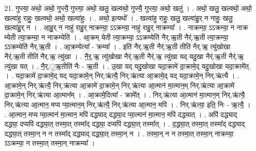 \documentclass[17pt]{extarticle}
\begin{document}
21. गुप्त्या॒ अथो॒ अथो॒ गुप्त्यै॒ गुप्त्या॒ अथो॒ खलु॒ खल्वथो॒ गुप्त्यै॒ गुप्त्या॒ अथो॒ खलु॑ । . अथो॒ खलु॒ खल्वथो॒ अथो॒ खल्वा॑हु राहुः॒ खल्वथो॒ अथो॒ खल्वा॑हुः । . अथो॒ इत्यथो᳚ । . खल्वा॑हु राहुः॒ खलु॒ खल्वा॑हु॒र् न नाहुः॒ खलु॒ खल्वा॑हु॒र् न । . आ॒हु॒र् न नाहु॑ राहु॒र् नाक्रम्या॒ ऽऽक्रम्या॒ नाहु॑ राहु॒र् नाक्रम्या᳚ । . नाक्रम्या॒ ऽऽक्रम्या॒ न नाक्र म्येती त्या॒क्रम्या॒ न नाक्रम्येति॑ । . आ॒क्रम् येती त्या॒क्रम्या॒ ऽऽक्रम्येति॑ नैर्.ऋ॒ती नैर्॑.ऋ॒ती त्या॒क्रम्या॒ ऽऽक्रम्येति॑ नैर्.ऋ॒ती । . आ॒क्रम्येत्या᳚ - क्रम्या᳚ । . इति॑ नैर्.ऋ॒ती नैर्॑.ऋ॒ती तीति॑ नैर्.ऋ॒ त्यु॑खोखा नैर्॑.ऋ॒ती तीति॑ नैर्.ऋ॒ त्यु॑खा । . नै॒र्॒.ऋ॒ त्यु॑खोखा नैर्॑.ऋ॒ती नैर्॑.ऋ॒ त्यु॑खा यद् यदु॒खा नैर्॑.ऋ॒ती नैर्॑.ऋ॒ त्यु॑खा यत् । . नै॒र्.॒ऋ॒तीति॑ नैः - ऋ॒ती । . उ॒खा यद् यदु॒खोखा यदा॒क्रामे॑ दा॒क्रामे॒द् यदु॒खोखा यदा॒क्रामे᳚त् । . यदा॒क्रामे॑ दा॒क्रामे॒द् यद् यदा॒क्रामे॒न् निर्.ऋ॑त्यै॒ निर्.ऋ॑त्या आ॒क्रामे॒द् यद् यदा॒क्रामे॒न् निर्.ऋ॑त्यै । . आ॒क्रामे॒न् निर्.ऋ॑त्यै॒ निर्.ऋ॑त्या आ॒क्रामे॑ दा॒क्रामे॒न् निर्.ऋ॑त्या आ॒त्मान॑ मा॒त्मान॒म् निर्.ऋ॑त्या आ॒क्रामे॑ दा॒क्रामे॒न् निर्.ऋ॑त्या आ॒त्मान᳚म् । . आ॒क्रामे॒दित्या᳚ - क्रामे᳚त् । . निर्.ऋ॑त्या आ॒त्मान॑ मा॒त्मान॒म् निर्.ऋ॑त्यै॒ निर्.ऋ॑त्या आ॒त्मान॒ मप्य प्या॒त्मान॒म् निर्.ऋ॑त्यै॒ निर्.ऋ॑त्या आ॒त्मान॒ मपि॑ । . निर्.ऋ॑त्या॒ इति॒ निः - ऋ॒त्यै॒ । . आ॒त्मान॒ मप्य प्या॒त्मान॑ मा॒त्मान॒ मपि॑ दद्ध्याद् दद्ध्या॒द प्या॒त्मान॑ मा॒त्मान॒ मपि॑ दद्ध्यात् । . अपि॑ दद्ध्याद् दद्ध्या॒ दप्यपि॑ दद्ध्या॒त् तस्मा॒त् तस्मा᳚द् दद्ध्या॒ दप्यपि॑ दद्ध्या॒त् तस्मा᳚त् । . द॒द्ध्या॒त् तस्मा॒त् तस्मा᳚द् दद्ध्याद् दद्ध्या॒त् तस्मा॒न् न न तस्मा᳚द् दद्ध्याद् दद्ध्या॒त् तस्मा॒न् न । . तस्मा॒न् न न तस्मा॒त् तस्मा॒न् नाक्रम्या॒ ऽऽक्रम्या॒ न तस्मा॒त् तस्मा॒न् नाक्रम्या᳚ । \newline
\end{document}
